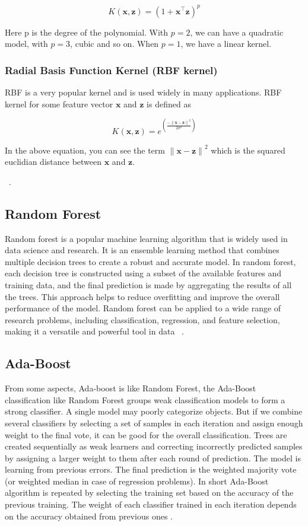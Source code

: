 \documentclass[final]{cvpr}
\begin{document}
    $$K(\mathbf{x}, \mathbf{z}) = (1 + \mathbf{x}^\intercal \mathbf{z})^p$$

    Here p is the degree of the polynomial. With $p = 2$, we can have a quadratic model, with $p = 3$, cubic and so on. When $p = 1$, we have a linear kernel.

\subsubsection{Radial Basis Function Kernel (RBF kernel)}

    RBF is a very popular kernel and is used widely in many applications. RBF kernel for some feature vector $\mathbf{x}$ and $\mathbf{z}$ is defined as

    $$K(\mathbf{x}, \mathbf{z}) = e^{\left(\frac{-{\parallel \mathbf{x}-\mathbf{z} \parallel}^2}{2 \sigma^2}\right)}$$

    In the above equation, you can see the term ${\lVert\mathbf x - \mathbf z \rVert}^2$ which is the squared euclidian distance between $\mathbf{x}$ and $\mathbf{z}$.
    
    ~\cite{Authors07}.

\subsection{Random Forest}

Random forest is a popular machine learning algorithm that is widely used in data science and research. 
It is an ensemble learning method that combines multiple decision trees to create a robust and accurate model. 
In random forest, each decision tree is constructed using a subset of the available features and training data, and the final prediction is made by aggregating the results of all the trees. 
This approach helps to reduce overfitting and improve the overall performance of the model. 
Random forest can be applied to a wide range of research problems, including classification, regression, and feature selection, making it a versatile and powerful tool in data  ~\cite{Authors03,Authors07}.

\subsection{Ada-Boost}

From some aspects, Ada-boost is like Random Forest, the Ada-Boost classification like Random Forest groups weak classification models to form a strong classifier. A single
model may poorly categorize objects. But if we combine several classifiers by selecting a set of samples in each iteration and assign enough weight to the final vote, it can be good
for the overall classification. Trees are created sequentially
as weak learners and correcting incorrectly predicted samples
by assigning a larger weight to them after each round of
prediction. The model is learning from previous errors. The
final prediction is the weighted majority vote (or weighted
median in case of regression problems). In short Ada-Boost
algorithm is repeated by selecting the training set based on the
accuracy of the previous training. The weight of each classifier
trained in each iteration depends on the accuracy obtained
from previous ones .
\end{document}
